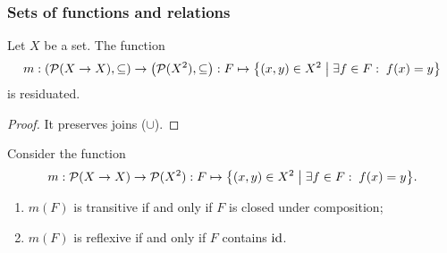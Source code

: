 \subsubsection{Sets of functions and relations}
\begin{proposition} \label{setOfFunctionsToRelationGaloisConnection}
Let $X$ be a set. The function
\[ m: \sSet{\powerset(X\to X), \subseteq} \to \sSet{\powerset(X^2), \subseteq}: F \mapsto \setbuilder{(x,y)\in X^2}{\exists f\in F: \; f(x) = y} \]
is residuated.
\end{proposition}
\begin{proof}
It preserves joins ($\cup$).
\end{proof}

\begin{proposition}
Consider the function
\[ m: \powerset(X\to X) \to \powerset(X^2): F \mapsto \setbuilder{(x,y)\in X^2}{\exists f\in F: \; f(x) = y}. \]
\begin{enumerate}
\item $m(F)$ is transitive \textup{if and only if} $F$ is closed under composition;
\item $m(F)$ is reflexive \textup{if and only if} $F$ contains $\operatorname{id}$.
\end{enumerate}
\end{proposition}

